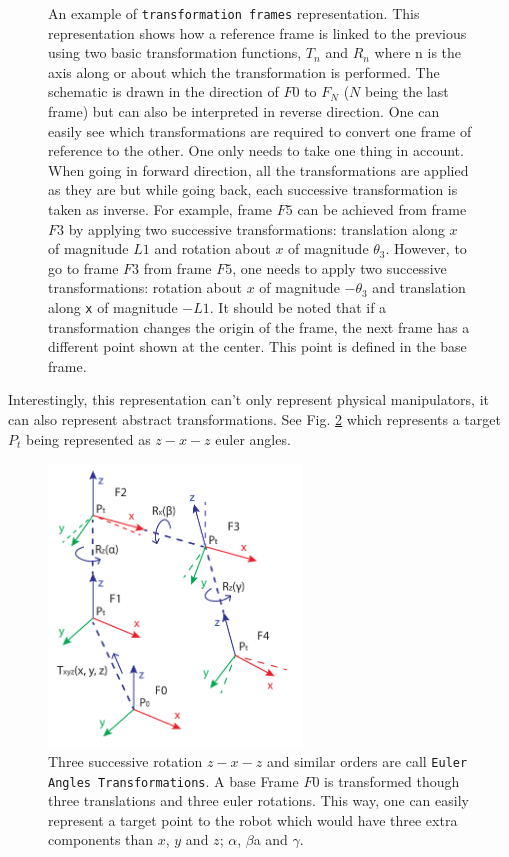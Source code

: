 {{\begin{figure}
          \caption{An example of \texttt{transformation frames} representation. This representation shows how a reference frame is linked to the previous using two basic transformation functions, $T_n$ and $R_n$ where n is the axis along or about which the transformation is performed. The schematic is drawn in the direction of $F0$ to $F_N$ ($N$ being the last frame) but can also be interpreted in reverse direction. One can easily see which transformations are required to convert one frame of reference to the other. One only needs to take one thing in account. When going in forward direction, all the transformations are applied as they are but while going back, each successive transformation is taken as inverse. For example, frame $F5$ can be achieved from frame $F3$ by applying two successive transformations: translation along $x$ of magnitude $L1$ and rotation about $x$ of magnitude $\theta_3$. However, to go to frame $F3$ from frame $F5$, one needs to apply two successive transformations: rotation about $x$ of magnitude $-\theta_3$ and translation along \texttt{x} of magnitude $-L1$. It should be noted that if a transformation changes the origin of the frame, the next frame has a different point shown at the center. This point is defined in the base frame.
          } \label{FigMyRep}
        \end{figure}

        Interestingly, this representation can't only represent physical manipulators, it can also represent abstract transformations. See Fig. \ref{FigEulerRep} which represents a target $P_t$ being represented as $z-x-z$ euler angles.

        \begin{figure}
          \centering
          \includegraphics[width=0.6\textwidth]{EulerANgles.pdf}
          \caption{Three successive rotation $z-x-z$ and similar orders are call \texttt{Euler Angles Transformations}. A base Frame $F0$ is transformed though three translations and three euler rotations. This way, one can easily represent a target point to the robot which would have three extra components than $x$, $y$ and $z$; $\alpha$, $\beta$a and $\gamma$.
          } \label{FigEulerRep}
        \end{figure}

}}
